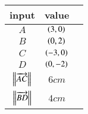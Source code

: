 \begin{tabular}[10pt]{ |c| c| c|}
    \hline
    \textbf{input} & \textbf{value}\\ 
    \hline
    $A$ &$\left(3,0\right)$\\
    \hline 
    $B$ &$\left(0,2\right)$\\
    \hline 
    $C$&$\left(-3,0\right)$\\
    \hline
    $D$&$\left(0,-2\right)$\\
    \hline
    $\left\lVert\overrightarrow{AC}\right\rVert$&$6cm$\\
    \hline
    $\left\lVert\overrightarrow{BD}\right\rVert$&$4cm$\\
    \hline
    \end{tabular}
